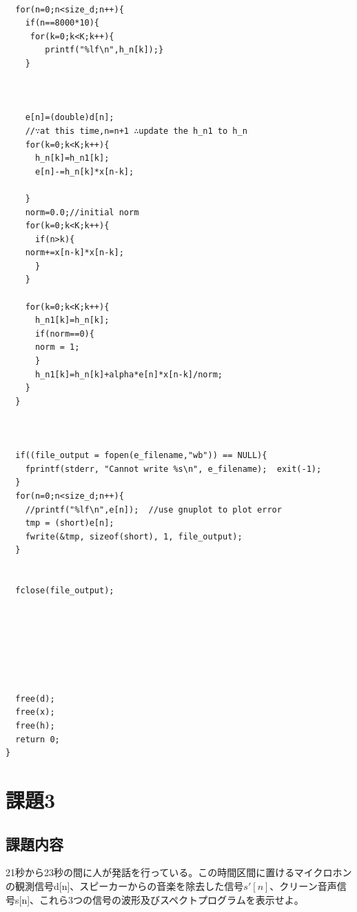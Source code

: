 \documentclass[a4j,12]{jarticle}
\begin{document}
\begin{lstlisting}[caption=課題2で使用するプログラム,label=rp2]
  
  for(n=0;n<size_d;n++){
    if(n==8000*10){
     for(k=0;k<K;k++){
    	printf("%lf\n",h_n[k]);}
    }


    
    e[n]=(double)d[n];
    //∵at this time,n=n+1 ∴update the h_n1 to h_n
    for(k=0;k<K;k++){
      h_n[k]=h_n1[k];
      e[n]-=h_n[k]*x[n-k];

    }
    norm=0.0;//initial norm
    for(k=0;k<K;k++){
      if(n>k){
	norm+=x[n-k]*x[n-k];
      }
    }
    
    for(k=0;k<K;k++){
      h_n1[k]=h_n[k];
      if(norm==0){
	  norm = 1;
      }
      h_n1[k]=h_n[k]+alpha*e[n]*x[n-k]/norm;
    }
  }
  
  
  
  if((file_output = fopen(e_filename,"wb")) == NULL){
    fprintf(stderr, "Cannot write %s\n", e_filename);  exit(-1);
  }
  for(n=0;n<size_d;n++){
    //printf("%lf\n",e[n]);  //use gnuplot to plot error
    tmp = (short)e[n];
    fwrite(&tmp, sizeof(short), 1, file_output);
  }
  

  fclose(file_output);





  

  free(d);
  free(x);
  free(h);
  return 0;
}

       \end{lstlisting}
       \section{課題3}
       \subsection{課題内容}
       21秒から23秒の間に人が発話を行っている。この時間区間に置けるマイクロホンの観測信号d[n]、スピーカーからの音楽を除去した信号$s'[n]$、クリーン音声信号s[n]、これら3つの信号の波形及びスペクトプログラムを表示せよ。
\end{document}
